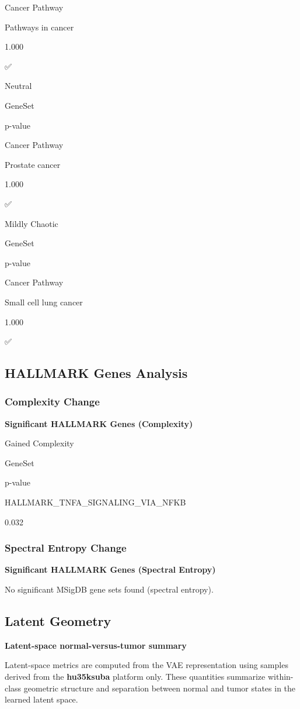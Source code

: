 \documentclass[
  letterpaper,
  DIV=11,
  numbers=noendperiod,
  openany,
  oneside]{scrreprt}
\begin{document}
Cancer Pathway

Pathways in cancer

1.000

✅

Neutral

GeneSet

p-value

Cancer Pathway

Prostate cancer

1.000

✅

Mildly Chaotic

GeneSet

p-value

Cancer Pathway

Small cell lung cancer

1.000

✅

\subsection{HALLMARK Genes Analysis}

\subsubsection{Complexity Change}

\textbf{Significant HALLMARK Genes (Complexity)}

Gained Complexity

GeneSet

p-value

HALLMARK\_TNFA\_SIGNALING\_VIA\_NFKB

0.032

\subsubsection{Spectral Entropy Change}

\textbf{Significant HALLMARK Genes (Spectral Entropy)}

No significant MSigDB gene sets found (spectral entropy).

\subsection{Latent Geometry}

\textbf{Latent-space normal-versus-tumor summary}

Latent-space metrics are computed from the VAE representation using
samples derived from the \textbf{hu35ksuba} platform only. These
quantities summarize within-class geometric structure and separation
between normal and tumor states in the learned latent space.
\end{document}
